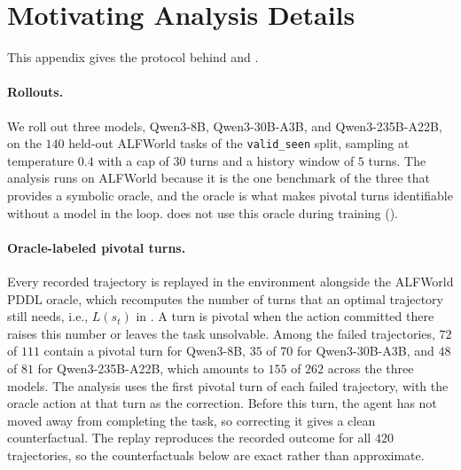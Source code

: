 \renewcommand{\thesection}{\Alph{section}}
\renewcommand\thefigure{S.\arabic{figure}}
\setcounter{figure}{0}
\renewcommand\thetable{S.\arabic{table}}
\setcounter{table}{0}

\raggedbottom
\section{Motivating Analysis Details}
\label{app:analysis}

This appendix gives the protocol behind  and .

\paragraph{Rollouts.} We roll out three models, Qwen3-8B, Qwen3-30B-A3B, and Qwen3-235B-A22B, on the $140$ held-out ALFWorld tasks of the \texttt{valid\_seen} split, sampling at temperature $0.4$ with a cap of $30$ turns and a history window of $5$ turns. The analysis runs on ALFWorld because it is the one benchmark of the three that provides a symbolic oracle, and the oracle is what makes pivotal turns identifiable without a model in the loop. \method{} does not use this oracle during training ().

\paragraph{Oracle-labeled pivotal turns.} Every recorded trajectory is replayed in the environment alongside the ALFWorld PDDL oracle, which recomputes the number of turns that an optimal trajectory still needs, i.e., $L(s_t)$ in . A turn is pivotal when the action committed there raises this number or leaves the task unsolvable. Among the failed trajectories, $72$ of $111$ contain a pivotal turn for Qwen3-8B, $35$ of $70$ for Qwen3-30B-A3B, and $48$ of $81$ for Qwen3-235B-A22B, which amounts to $155$ of $262$ across the three models. The analysis uses the first pivotal turn of each failed trajectory, with the oracle action at that turn as the correction. Before this turn, the agent has not moved away from completing the task, so correcting it gives a clean counterfactual. The replay reproduces the recorded outcome for all $420$ trajectories, so the counterfactuals below are exact rather than approximate.


